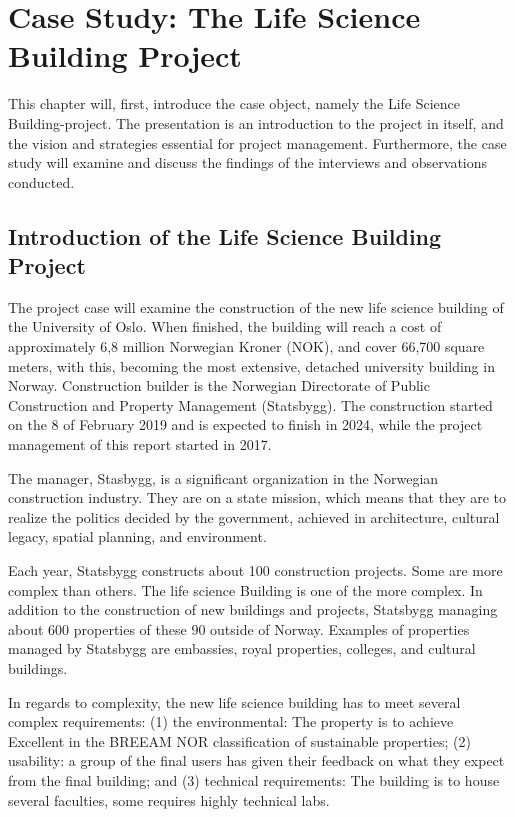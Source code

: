 
\chapter{Case Study: The Life Science Building Project}
This chapter will, first, introduce the case object, namely the Life Science Building-project. The presentation is an introduction to the project in itself, and the vision and strategies essential for project management. Furthermore, the case study will examine and discuss the findings of the interviews and observations conducted.
\section{Introduction of the Life Science Building Project}
The project case will examine the construction of the new life science building of the University of Oslo. When finished, the building will reach a cost of approximately 6,8 million Norwegian Kroner (NOK), and cover 66,700 square meters, with this, becoming the most extensive, detached university building in Norway. Construction builder is the Norwegian Directorate of Public Construction and Property Management (Statsbygg). The construction started on the 8 of February 2019 and is expected to finish in 2024, while the project management of this report started in 2017.

The manager, Stasbygg, is a significant organization in the Norwegian construction industry. They are on a state mission, which means that they are to realize the politics decided by the government, achieved in architecture, cultural legacy, spatial planning, and environment. 

Each year, Statsbygg constructs about 100 construction projects. Some are more complex than others. The life science Building is one of the more complex. In addition to the construction of new buildings and projects, Statsbygg managing about 600 properties of these 90 outside of Norway. Examples of properties managed by Statsbygg are embassies, royal properties, colleges, and cultural buildings. 

In regards to complexity, the new life science building has to meet several complex requirements: (1) the environmental: The property is to achieve Excellent in the BREEAM NOR classification of sustainable properties; (2) usability: a group of the final users has given their feedback on what they expect from the final building; and (3) technical requirements: The building is to house several faculties, some requires highly technical labs.

